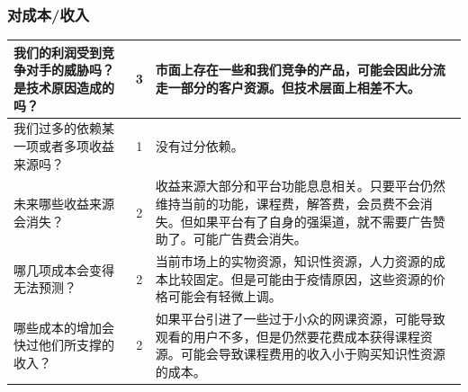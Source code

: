 \documentclass[a4paper]{ctexart}
\begin{document}
\FloatBarrier
\subsubsection{对成本/收入}
\begin{table}[h]
  \centering
\begin{tabular}{|p{3.5cm}|c|p{10cm}|}
  \hline
  我们的利润受到竞争对手的威胁吗？是技术原因造成的吗？ & 3 & 市面上存在一些和我们竞争的产品，可能会因此分流走一部分的客户资源。但技术层面上相差不大。\\
  \hline
  我们过多的依赖某一项或者多项收益来源吗？ & 1 & 没有过分依赖。\\
  \hline
  未来哪些收益来源会消失？ & 2 & 收益来源大部分和平台功能息息相关。只要平台仍然维持当前的功能，课程费，解答费，会员费不会消失。但如果平台有了自身的强渠道，就不需要广告赞助了。可能广告费会消失。\\
  \hline
  哪几项成本会变得无法预测？ & 2 & 当前市场上的实物资源，知识性资源，人力资源的成本比较固定。但是可能由于疫情原因，这些资源的价格可能会有轻微上调。\\
  \hline
  哪些成本的增加会快过他们所支撑的收入？& 2 & 如果平台引进了一些过于小众的网课资源，可能导致观看的用户不多，但是仍然要花费成本获得课程资源。可能会导致课程费用的收入小于购买知识性资源的成本。\\
  \hline
\end{tabular}
\end{table}





\FloatBarrier
\end{document}
